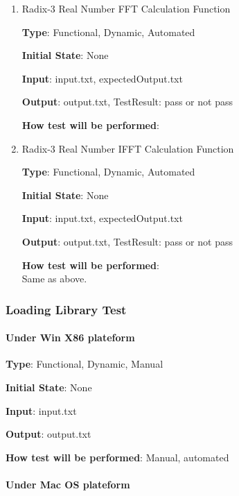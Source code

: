 \documentclass[12pt, titlepage]{article}
\begin{document}
\begin{enumerate}

\item{Radix-3 Real Number FFT Calculation Function\\}

\textbf {Type}: Functional, Dynamic, Automated
					
\textbf {Initial State}: None
					
\textbf {Input}: input.txt, expectedOutput.txt
					
\textbf {Output}:  output.txt, TestResult: pass or not pass
					
\textbf {How test will be performed}: \\


\item{Radix-3 Real Number IFFT Calculation Function\\}

\textbf {Type}: Functional, Dynamic, Automated
					
\textbf {Initial State}: None
					
\textbf {Input}: input.txt, expectedOutput.txt
					
\textbf {Output}:  output.txt, TestResult: pass or not pass

\textbf {How test will be performed}: \\
Same as above.
\end{enumerate}

\subsubsection{Loading Library Test}

\paragraph{Under Win X86 plateform\\}

\textbf {Type}: Functional, Dynamic, Manual
					
\textbf {Initial State}: None
					
\textbf {Input}: input.txt
					
\textbf {Output}: output.txt
					
\textbf {How test will be performed}: Manual, automated


\paragraph{Under Mac OS plateform\\}
\end{document}

